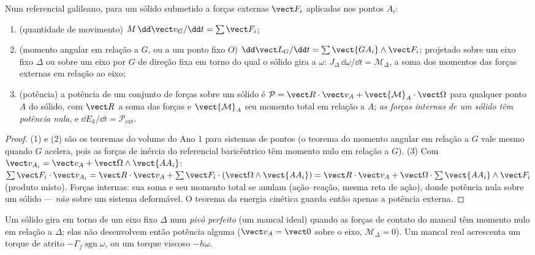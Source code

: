 \begin{theorem}\label{thm:b2:rigid-body-mechanics:laws}
Num referencial galileano, para um sólido submetido a forças externas
$\vect F_i$ aplicadas nos pontos $A_i$:
\begin{enumerate}
  \item (quantidade de movimento) $M\,\dd\vect v_G/\dd t = \sum\vect F_i$;
  \item (momento angular em relação a $G$, ou a um ponto fixo $O$)
        $\dd\vect L_G/\dd t = \sum\vect{GA_i}\wedge\vect F_i$; projetado
        sobre um eixo fixo $\Delta$ ou sobre um eixo por $G$ de direção
        fixa em torno do qual o sólido gira a $\omega$:
        $J_\Delta\,\dd\omega/\dd t = \mathcal M_\Delta$, a soma dos
        momentos das forças externas em relação ao eixo;
  \item (potência) a potência de um conjunto de forças sobre um sólido é
        $\mathcal P = \vect R\cdot\vect v_A + \vect{\mathcal M}_A\cdot
        \vect\Omega$ para qualquer ponto $A$ do sólido, com $\vect R$ a
        soma das forças e $\vect{\mathcal M}_A$ seu momento total em
        relação a $A$; \emph{as forças internas de um sólido têm
        potência nula}, e $\dd E_k/\dd t = \mathcal P_{\text{ext}}$.
\end{enumerate}
\end{theorem}

\begin{proof}
(1) e (2) são os teoremas do volume do Ano 1 para sistemas de pontos
(o teorema do momento angular em relação a $G$ vale mesmo quando $G$
acelera, pois as forças de inércia do referencial baricêntrico têm
momento nulo em relação a $G$). (3) Com $\vect v_{A_i} = \vect v_A + \vect\Omega
\wedge\vect{AA_i}$: $\sum\vect F_i\cdot\vect v_{A_i} = \vect R\cdot\vect v_A
+ \sum\vect F_i\cdot(\vect\Omega\wedge\vect{AA_i}) = \vect R\cdot\vect v_A +
\vect\Omega\cdot\sum\vect{AA_i}\wedge\vect F_i$ (produto misto). Forças
internas: sua soma e seu momento total se anulam (ação--reação, mesma
reta de ação), donde potência nula sobre um sólido --- \emph{não} sobre um
sistema deformável. O teorema da energia cinética guarda então apenas a potência externa.
\end{proof}

\begin{definition}\label{def:b2:rigid-body-mechanics:pivot}
Um sólido gira em torno de um eixo fixo $\Delta$ num \emph{pivô perfeito}
(um mancal ideal) quando as forças de contato do mancal têm momento
nulo em relação a $\Delta$; elas não desenvolvem então potência alguma
($\vect v_A = \vect 0$ sobre o eixo, $\mathcal M_\Delta = 0$). Um mancal
real acrescenta um torque de atrito $-\Gamma_f\operatorname{sgn}\omega$,
ou um torque viscoso $-h\omega$.
\end{definition}

